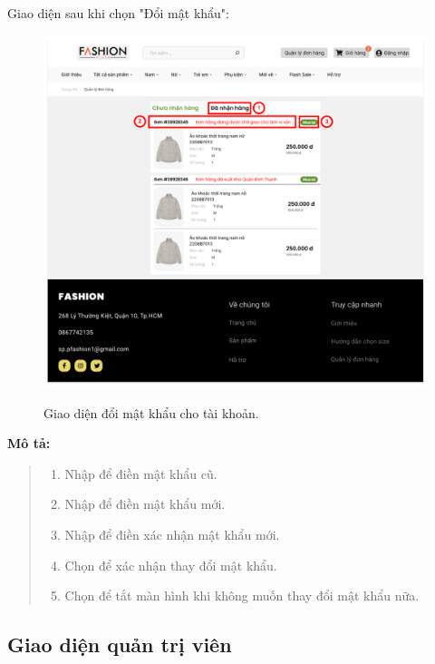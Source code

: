     Giao diện sau khi chọn "Đổi mật khẩu":
    \begin{figure}[!htp]
        \centering
        \includegraphics[width=5in]{img/UI/customer/customer_order.png}
        \label{16}
        \newline
        \caption{Giao diện đổi mật khẩu cho tài khoản.}
    \end{figure}
    \textbf{Mô tả:}  
    \begin{quote}
        \begin{enumerate}
            \item Nhập để điền mật khẩu cũ.
            \item Nhập để điền mật khẩu mới.
            \item Nhập để điền xác nhận mật khẩu mới.
            \item Chọn để xác nhận thay đổi mật khẩu.
            \item Chọn để tắt màn hình khi không muốn thay đổi mật khẩu nữa.
        \end{enumerate}
    \end{quote}   
    
\subsection{Giao diện quản trị viên}
